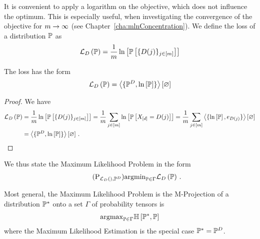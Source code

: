 It is convenient to apply a logarithm on the objective, which does not influence the optimum.
This is especially useful, when investigating the convergence of the objective for $m\rightarrow\infty$ (see Chapter~\ref{cha:mlnConcentration}).
We define the loss of a distribution $\mathbb{P}$ as
\begin{align}\label{eq:defLikelihoodLossPL}
	\mathcal{L}_{D}\left(\mathbb{P}\right) 
	= \frac{1}{m} \ln \left[ \mathbb{P}\left[\{D(j)\}_{j\in[m]}\right] \right] 
\end{align}

\begin{lemma}
	The loss has the form 
	\begin{align}
		\mathcal{L}_{D}\left(\mathbb{P}\right) = \left\langle \{\mathbb{P}^{D},\ln \left[ \mathbb{P} \right]\}\right\rangle \left[ \varnothing \right]
	\end{align}
\end{lemma}
\begin{proof}
	We have
	\begin{align*}
		\lossof{\probtensor} 
		& = \frac{1}{\datanum} \lnof{\probof{\data}} 
		= \frac{1}{\datanum} \sum_{\datain} \lnof{\probof{\shortcatvariables =\datamap(\dataindex)}} 
		= \frac{1}{\datanum} \sum_{\datain} \contractionof{\{\lnof{\probtensor},\onehotmapof{\datamap(\dataindex)}\}}{\varnothing} \\ 
		& = \contractionof{\{\empdistribution,\lnof{\probtensor}\}}{\varnothing} \, .
	\end{align*}
\end{proof}

We thus state the Maximum Likelihood Problem in the form
\begin{align}\tag{$\mathrm{P}_{\lossof{}, \empdistribution}$}\label{prob:parameterMaxLikelihood}
	\argmin_{\probtensor\in\Gamma} \lossof{\probtensor} \, . %
\end{align}



Most general, the Maximum Likelihood Problem is the M-Projection of a distribution $\mathbb{P}^*$ onto a set $\Gamma$ of probability tensors is
\begin{align}
	\mathrm{argmax}_{\mathbb{P}\in\Gamma}  \mathbb{H}\left[\mathbb{P}^*,\mathbb{P}\right] 
\end{align}
where the Maximum Likelihood Estimation is the special case $\mathbb{P}^*=\mathbb{P}^{D}$.




